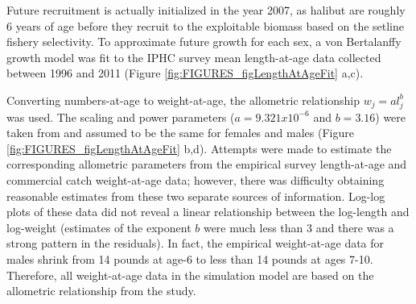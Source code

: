 Future recruitment is actually initialized in the year 2007, as halibut are roughly 6 years of age before they recruit to the exploitable biomass based on the setline fishery selectivity. 
To approximate future growth for each sex, a von Bertalanffy growth model was fit to the IPHC survey mean length-at-age data collected between 1996 and 2011 (Figure \ref{fig:FIGURES_figLengthAtAgeFit} a,c).    

Converting numbers-at-age to weight-at-age, the allometric relationship $w_j= a l_j^b$ was used.  The scaling and power parameters ($a=9.321x10^{-6}$ and $b=3.16$) were taken from \cite{courcellesre} and assumed to be the same for females and males (Figure \ref{fig:FIGURES_figLengthAtAgeFit} b,d).    Attempts were made to estimate the corresponding allometric parameters from the empirical survey length-at-age and commercial catch weight-at-age data; however, there was difficulty obtaining reasonable estimates from these two separate sources of information.  Log-log plots of these data did not reveal a linear relationship between the log-length and log-weight (estimates of the exponent $b$ were much less than 3 and there was a strong pattern in the residuals).  In fact, the empirical weight-at-age data for males shrink from 14 pounds at age-6 to less than 14 pounds at ages 7-10.  Therefore, all weight-at-age data in the simulation model are based on the allometric relationship from the \cite{courcellesre} study.
   
